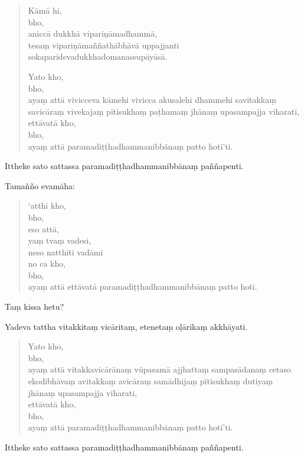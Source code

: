 \documentclass[11pt,twoside,openright]{book}
\begin{document}
\begin{verse}
Kāmā hi,\\
\vin  bho,\\
\vin  aniccā dukkhā vipariṇāmadhammā,\\
\vin  tesaṃ vipariṇāmaññathābhāvā uppajjanti sokaparidevadukkhadomanassupāyāsā.

Yato kho,\\
\vin  bho,\\
\vin  ayaṃ attā vivicceva kāmehi vivicca akusalehi dhammehi savitakkaṃ savicāraṃ vivekajaṃ pītisukhaṃ paṭhamaṃ jhānaṃ upasampajja viharati,\\
\vin  ettāvatā kho,\\
\vin  bho,\\
\vin  ayaṃ attā paramadiṭṭhadhammanibbānaṃ patto hotī’ti.

\end{verse}
\pstart
Ittheke sato sattassa paramadiṭṭhadhammanibbānaṃ paññapenti.
\pend

\pstart
Tamañño evamāha:
\pend

\begin{verse}
‘atthi kho,\\
\vin  bho,\\
\vin  eso attā,\\
\vin  yaṃ tvaṃ vadesi,\\
\vin  neso natthīti vadāmi\\


no ca kho,\\
\vin  bho,\\
\vin  ayaṃ attā ettāvatā paramadiṭṭhadhammanibbānaṃ patto hoti.

\end{verse}
\pstart
Taṃ kissa hetu?
\pend

\pstart
Yadeva tattha vitakkitaṃ vicāritaṃ, etenetaṃ oḷārikaṃ akkhāyati.
\pend

\begin{verse}
Yato kho,\\
\vin  bho,\\
\vin  ayaṃ attā vitakkavicārānaṃ vūpasamā ajjhattaṃ sampasādanaṃ cetaso ekodibhāvaṃ avitakkaṃ avicāraṃ samādhijaṃ pītisukhaṃ dutiyaṃ jhānaṃ upasampajja viharati,\\
\vin  ettāvatā kho,\\
\vin  bho,\\
\vin  ayaṃ attā paramadiṭṭhadhammanibbānaṃ patto hotī’ti.

\end{verse}
\pstart
Ittheke sato sattassa paramadiṭṭhadhammanibbānaṃ paññapenti.
\pend
\end{document}
